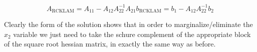 \begin{subequations}
  \begin{equation}
    A_\mathrm{RCKLAM} = A_{11} - A_{12}A_{22}^{-1}A_{21}
  \end{equation}

  \begin{equation}
    b_\mathrm{RCKLAM} = b_1 - A_{12}A_{22}^{-1}b_2
  \end{equation}
  \label{RCKLAM_FINAL_EQ}
\end{subequations}

Clearly the form of the solution shows that in order to marginalize/eliminate the $x_2$ variable we just need to take the schure complement of the appropriate block of the square root hessian matrix, in exactly the same way as before.